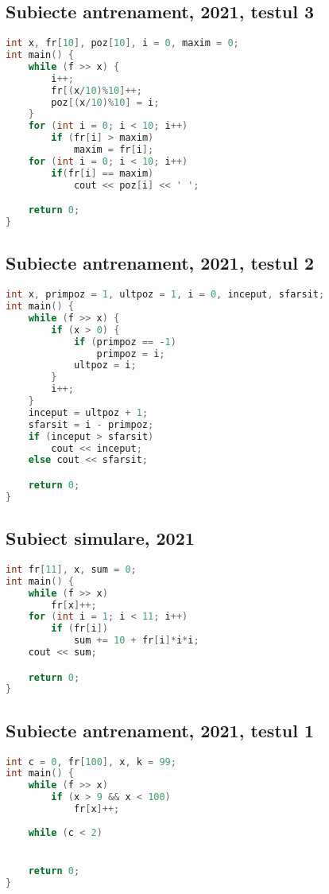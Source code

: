 \documentclass[10pt, a4paper, twocolumn]{article}
\begin{document}
\newpage
\subsection*{Subiecte antrenament, 2021, testul 3}
\begin{lstlisting}[language=C++]
int x, fr[10], poz[10], i = 0, maxim = 0;
int main() {
    while (f >> x) {
        i++;
        fr[(x/10)%10]++;
        poz[(x/10)%10] = i;
    }
    for (int i = 0; i < 10; i++)
        if (fr[i] > maxim)
            maxim = fr[i];
    for (int i = 0; i < 10; i++)
        if(fr[i] == maxim)
            cout << poz[i] << ' ';

    return 0;
}
\end{lstlisting}


\subsection*{Subiecte antrenament, 2021, testul 2}
\begin{lstlisting}[language=C++]
int x, primpoz = 1, ultpoz = 1, i = 0, inceput, sfarsit;
int main() {
    while (f >> x) {
        if (x > 0) {
            if (primpoz == -1)
                primpoz = i;
            ultpoz = i;
        }
        i++;
    }
    inceput = ultpoz + 1;
    sfarsit = i - primpoz;
    if (inceput > sfarsit)
        cout << inceput;
    else cout << sfarsit;

    return 0;
}
\end{lstlisting}


\subsection*{Subiect simulare, 2021}
\begin{lstlisting}[language=C++]
int fr[11], x, sum = 0;
int main() {
    while (f >> x)
        fr[x]++;
    for (int i = 1; i < 11; i++)
        if (fr[i])
            sum += 10 + fr[i]*i*i;
    cout << sum;

    return 0;
}
\end{lstlisting}


\subsection*{Subiecte antrenament, 2021, testul 1}
\begin{lstlisting}[language=C++]
int c = 0, fr[100], x, k = 99;
int main() {
    while (f >> x)
        if (x > 9 && x < 100)
            fr[x]++;
    
    while (c < 2)


    return 0;
}
\end{lstlisting}
\end{document}
